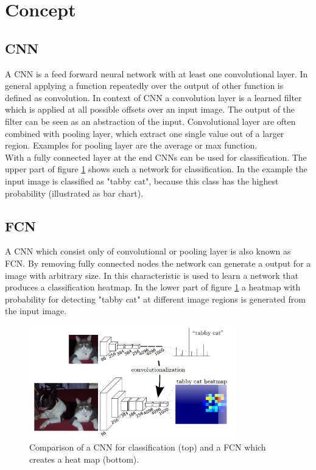 \section{Concept}\label{sec:concept}
\subsection{CNN}
A \gls{CNN} is a feed forward neural network with at least one convolutional layer. In general applying a function repeatedly  over the output of other function is defined as convolution. In context of \gls{CNN} a convolution layer is a learned filter which is applied at all possible offsets over an input image. The output of the filter can be seen as an abstraction of the input. Convolutional layer are often combined with pooling layer, which extract one single value out of a larger region. Examples for pooling layer are the average or max function.\\
With a fully connected layer at the end \gls{CNN}s can be used for classification. The upper part of figure \ref{fig:fcn} shows such a network for classification. In the example the input image is classified as "tabby cat", because this class has the highest probability (illustrated as bar chart).

\subsection{FCN}
A \gls{CNN} which consist only of convolutional or pooling layer is also known as \gls{FCN}. By removing fully connected nodes the network can generate a output for a image with arbitrary size. In \cite{long2014fully} this characteristic is used to learn a network that produces a classification heatmap. In the lower part of figure \ref{fig:fcn} a heatmap with probability for detecting "tabby cat" at different image regions is generated from the input image.

\begin{figure}[htb]
\label{fig:fcn}
	\centering
	\includegraphics[width=9cm]{figures/fcnn}
	\caption{Comparison of a \gls{CNN} for classification (top) and a \gls{FCN} which creates a heat map (bottom). \cite{long2014fully}}
\end{figure}

